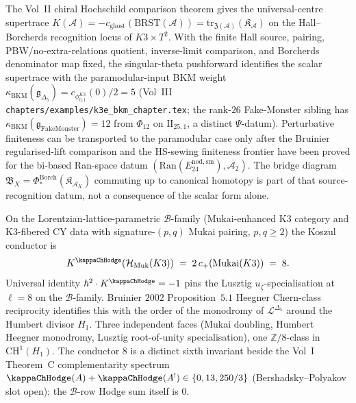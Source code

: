 \begin{remark}
\label{rem:thqg-pf-phi-trace}
The Vol~II chiral Hochschild comparison theorem gives the
universal-centre supertrace
$K(\mathcal{A}) = -c_{\mathrm{ghost}}(\mathrm{BRST}(\mathcal{A}))
= \mathrm{tr}_{\mathfrak{Z}(\mathcal{A})}(\mathfrak{K}_{\mathcal{A}})$
on the Hall--Borcherds recognition locus of $K3 \times T^2$. With the
finite Hall source, pairing, PBW/no-extra-relations quotient,
inverse-limit comparison, and Borcherds denominator map fixed, the
singular-theta pushforward identifies the
scalar supertrace with the paramodular-input BKM weight
$\kappa_{\mathrm{BKM}}(\mathfrak{g}_{\Delta_5})
= c_{\phi_{0,1}^{K3}}(0)/2 = 5$ (Vol~III
\texttt{chapters/examples/k3e\_bkm\_chapter.tex}; the rank-$26$
Fake-Monster sibling has
$\kappa_{\mathrm{BKM}}(\mathfrak{g}_{\mathrm{FakeMonster}}) = 12$ from
$\Phi_{12}$ on $\mathrm{II}_{25,1}$, a distinct $\Psi$-datum).
Perturbative finiteness can be transported to the paramodular case only
after the Bruinier regularised-lift comparison and the HS-sewing
finiteness frontier have been proved for the bi-based Ran-space datum
$(\mathrm{Ran}(E^{\mathrm{nod,sm}}_{24}), \overline{\mathcal{A}_2})$.
The bridge diagram
$\mathfrak{B}_X = \Phi^{\mathrm{Borch}}_*(\mathfrak{K}_{\mathcal{A}_X})$
commuting up to canonical homotopy is part of that source-recognition
datum, not a consequence of the scalar form alone.
\end{remark}

\begin{remark}[$K^{\kappaChHodge} = 8$ Mukai doubling on the $\mathcal{B}$-family]
\label{rem:thqg-pf-Kkappa-8}
On the Lorentzian-lattice-parametric $\mathcal{B}$-family (Mukai-enhanced K3 category and K3-fibered CY data with signature-$(p, q)$ Mukai pairing, $p, q \geq 2$) the Koszul conductor is
\[
 K^{\kappaChHodge}(\mathcal{H}_{\mathrm{Muk}}(K3)) \;=\; 2\,c_+(\mathrm{Mukai}(K3)) \;=\; 8.
\]
Universal identity $\hbar^2 \cdot K^{\kappaChHodge} = -1$ pins the Lusztig $u_\zeta$-specialisation at $\ell = 8$ on the $\mathcal{B}$-family. Bruinier $2002$ Proposition~$5.1$ Heegner Chern-class reciprocity identifies this with the order of the monodromy of $\mathcal{L}^{\Delta_5}$ around the Humbert divisor $H_1$. Three independent faces (Mukai doubling, Humbert Heegner monodromy, Lusztig root-of-unity specialisation), one $\mathbb{Z}/8$-class in $\mathrm{CH}^1(H_1)$. The conductor $8$ is a distinct sixth invariant beside the Vol~I Theorem~C complementarity spectrum $\kappaChHodge(A) + \kappaChHodge(A^!) \in \{0, 13, 250/3\}$ (Bershadsky--Polyakov slot open); the $\mathcal{B}$-row Hodge sum itself is $0$.
\end{remark}

